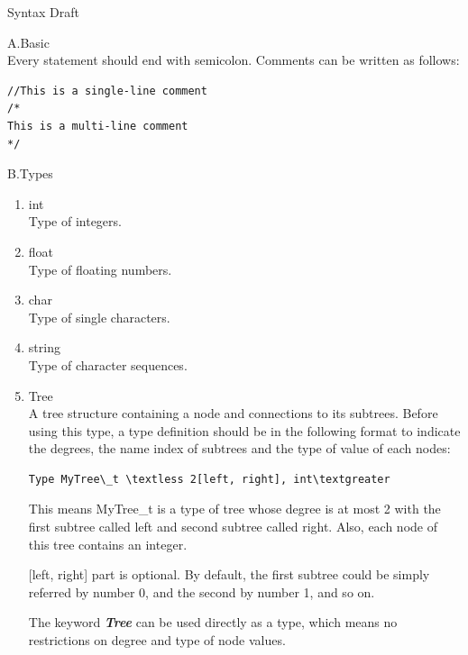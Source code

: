 \documentclass[aps,letterpaper,10pt]{revtex4}
\makeatletter
\renewcommand{\section}{\@startsection{section}{1}{0mm}
  {-\baselineskip}{0.5\baselineskip}{\bf\leftline}}
\makeatother
\begin{document}
\section{Syntax Draft}
\begin{description}
\item A.Basic\\
Every statement should end with semicolon.
\vspace{3mm}
Comments can be written as follows:
\begin{lstlisting}
//This is a single-line comment
/*
This is a multi-line comment
*/

\end{lstlisting}

\item B.Types\\
\begin{enumerate}
\item int\\
Type of integers.
\item float\\
Type of floating numbers.
\item char\\
Type of single characters.
\item string\\
Type of character sequences.
\item Tree\\
A tree structure containing a node and connections to its subtrees. Before using this type, a type definition should be in the following format to indicate the degrees, the name index of subtrees and the type of value of each nodes:

\begin{lstlisting}
Type MyTree\_t \textless 2[left, right], int\textgreater
\end{lstlisting}

\vspace{2mm}
This means MyTree\_t is a type of tree whose degree is at most 2 with the first subtree called left and second subtree called right. Also, each node of this tree contains an integer.

\vspace{2mm}
[left, right] part is optional. By default, the first subtree could be simply referred by number 0, and the second by number 1, and so on.

\vspace{2mm}
The keyword \textbf{\emph{Tree}} can be used directly as a type, which means no restrictions on degree and type of node values.


\end{enumerate}
\end{description}
\end{document}
